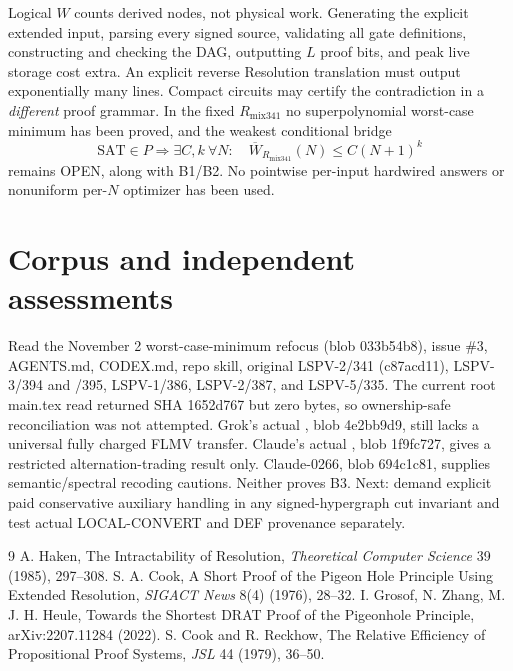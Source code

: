 \documentclass[11pt]{article}
\begin{document}
Logical $W$ counts derived nodes, not physical work. Generating the explicit extended input, parsing every signed source, validating all gate definitions, constructing and checking the DAG, outputting $L$ proof bits, and peak live storage cost extra. An explicit reverse Resolution translation must output exponentially many lines. Compact circuits may certify the contradiction in a \emph{different} proof grammar. In the fixed $R_{\mathrm{mix341}}$ no superpolynomial worst-case minimum has been proved, and the weakest conditional bridge
\[
\mathrm{SAT}\in P\Longrightarrow
\exists C,k\ \forall N:\quad\overline W_{R_{\mathrm{mix341}}}(N)\le C(N+1)^k
\]
remains OPEN, along with B1/B2. No pointwise per-input hardwired answers or nonuniform per-$N$ optimizer has been used.

\section*{Corpus and independent assessments}
Read the November 2 worst-case-minimum refocus (blob 033b54b8), issue \#3, AGENTS.md, CODEX.md, repo skill, original LSPV-2/341 (c87acd11), LSPV-3/394 and /395, LSPV-1/386, LSPV-2/387, and LSPV-5/335. The current root main.tex read returned SHA 1652d767 but zero bytes, so ownership-safe reconciliation was not attempted. Grok's actual , blob 4e2bb9d9, still lacks a universal fully charged FLMV transfer. Claude's actual , blob 1f9fc727, gives a restricted alternation-trading result only. Claude-0266, blob 694c1c81, supplies semantic/spectral recoding cautions. Neither proves B3. Next: demand explicit paid conservative auxiliary handling in any signed-hypergraph cut invariant and test actual LOCAL-CONVERT and DEF provenance separately.

\begin{thebibliography}{9}
 A. Haken, The Intractability of Resolution, \emph{Theoretical Computer Science} 39 (1985), 297--308.
 S. A. Cook, A Short Proof of the Pigeon Hole Principle Using Extended Resolution, \emph{SIGACT News} 8(4) (1976), 28--32.
 I. Grosof, N. Zhang, M. J. H. Heule, Towards the Shortest DRAT Proof of the Pigeonhole Principle, arXiv:2207.11284 (2022).
 S. Cook and R. Reckhow, The Relative Efficiency of Propositional Proof Systems, \emph{JSL} 44 (1979), 36--50.
\end{thebibliography}
\end{document}
